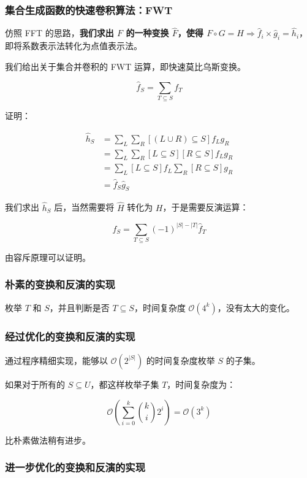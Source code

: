 \documentclass[12pt]{article} %
\begin{document}
\subsubsection*{集合生成函数的快速卷积算法：FWT}

仿照 FFT 的思路，\textbf{我们求出 $F$ 的一种变换 $\hat F$，使得 $F \circ G = H \Rightarrow \hat f_i \times \hat g_i = \hat h_i$}，即将系数表示法转化为点值表示法。

我们给出关于集合并卷积的 FWT 运算，即快速莫比乌斯变换。

$$\hat f_S=\sum_{T \subseteq S} f_T$$

证明：

$$
\begin{aligned}
    \hat h_S &=\sum_{L} \sum_{R} [(L \cup R) \subseteq S] f_L g_R \\
         &= \sum_{L} \sum_{R} [L \subseteq S][R \subseteq S] f_L g_R \\
         &= \sum_{L} [L \subseteq S] f_L \sum_{R} [R \subseteq S] g_R \\
         &= \hat f_S \hat g_S
\end{aligned}
$$

我们求出 $\hat h_S$ 后，当然需要将 $\hat H$ 转化为 $H$，于是需要反演运算：

$$f_S=\sum_{T \subseteq S} (-1)^{|S|-|T|}\hat f_T$$

由容斥原理可以证明。

\subsubsection*{朴素的变换和反演的实现}

枚举 $T$ 和 $S$，并且判断是否 $T \subseteq S$，时间复杂度 $\mathcal O(4^k)$，没有太大的变化。

\subsubsection*{经过优化的变换和反演的实现}

通过程序精细实现，能够以 $\mathcal O(2^{|S|})$ 的时间复杂度枚举 $S$ 的子集。

如果对于所有的 $S \subseteq U$，都这样枚举子集 $T$，时间复杂度为：

$$\mathcal O\left(\sum_{i=0}^k \binom{k}{i}2^i\right)= \mathcal O(3^k)$$

比朴素做法稍有进步。

\subsubsection*{进一步优化的变换和反演的实现}
\end{document}
